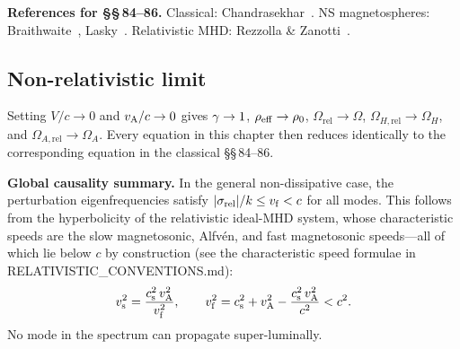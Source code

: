 \medskip
\noindent\textbf{References for \S\S\,84--86.}
Classical: Chandrasekhar~\cite{Chandrasekhar1961}.
NS magnetospheres: Braithwaite~\cite{Braithwaite2009},
Lasky~\cite{Lasky2015}.
Relativistic MHD: Rezzolla \& Zanotti~\cite{RezzollaZanotti2013}.

\subsection{Non-relativistic limit}

Setting $V/c \to 0$ and $v_{\mathrm{A}}/c \to 0$ gives $\gamma \to 1$,
$\rho_{\mathrm{eff}} \to \rho_0$,
$\Omega_{\mathrm{rel}} \to \Omega$,
$\Omega_{H,\mathrm{rel}} \to \Omega_H$, and
$\Omega_{A,\mathrm{rel}} \to \Omega_A$.  Every equation
in this chapter then reduces identically to the corresponding
equation in the classical \S\S\,84--86.

\begin{causalitycheck}
\textbf{Global causality summary.}
In the general non-dissipative case, the perturbation eigenfrequencies
satisfy $|\sigma_{\mathrm{rel}}|/k \le v_{\mathrm{f}} < c$ for all modes.
This follows from the hyperbolicity of the relativistic ideal-MHD
system, whose characteristic speeds are the slow magnetosonic,
Alfv\'en, and fast magnetosonic speeds---all of which lie below $c$
by construction (see the characteristic speed formulae in
RELATIVISTIC\_CONVENTIONS.md):
\begin{equation}
  v_{\mathrm{s}}^{2}
  = \frac{c_{\mathrm{s}}^{2}\,v_{\mathrm{A}}^{2}}{v_{\mathrm{f}}^{2}},
  \qquad
  v_{\mathrm{f}}^{2}
  = c_{\mathrm{s}}^{2} + v_{\mathrm{A}}^{2}
    - \frac{c_{\mathrm{s}}^{2}\,v_{\mathrm{A}}^{2}}{c^{2}}
  < c^{2}.
  \label{eq:rel9-char-speeds}
\end{equation}
No mode in the spectrum can propagate super-luminally.
\end{causalitycheck}
